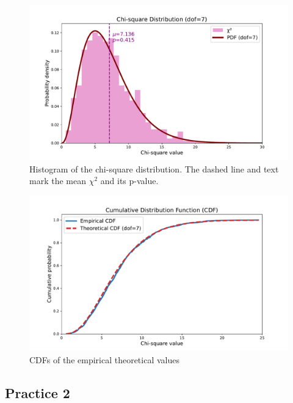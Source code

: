 \documentclass[12pt,a4paper]{article}
\begin{document}
\begin{CJK}{UTF8}{bkai}
\begin{figure}[h]
    \centering
    \includegraphics[width=1\linewidth]{figures/output/practice_2/output2_3.pdf}
    \caption{Histogram of the chi-square distribution. The dashed line and text mark the mean $\chi^2$ and its p-value.}
    \label{fig:output2_3}
\end{figure}
\begin{figure}[h]
    \centering
    \includegraphics[width=1\linewidth]{figures/output/practice_1/output1_4.pdf}
    \caption{CDFs of the empirical theoretical values}
    \label{fig:output1_4}
\end{figure}

\clearpage
\subsection{Practice 2}
\hfill



\end{CJK}
\end{document}
